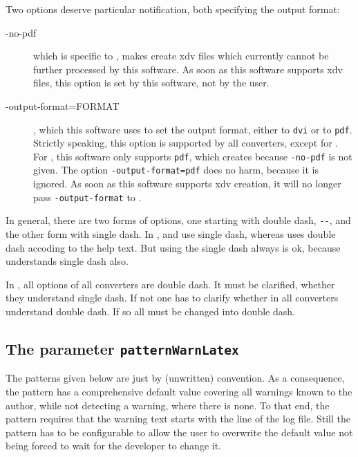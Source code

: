 Two options deserve particular notification, both specifying the output format: 
%
\begin{description}
  \item[-no-pdf] which is specific to \xelatex, makes \xelatex{} create xdv files 
  which currently cannot be further processed by this software. 
  As soon as this software supports xdv files, this option is set by this software, 
  not by the user. 
  \item[-output-format=FORMAT], which this software uses to set the output format, 
  either to \texttt{dvi} or to \texttt{pdf}. 
  Strictly speaking, this option is supported by all converters, except for \xelatex. 
  For \xelatex, this software only supports \texttt{pdf}, 
  which \xelatex{} creates because \texttt{-no-pdf} is not given. 
  The option \texttt{-output-format=pdf} does no harm, because it is ignored. 
  As soon as this software supports xdv creation, 
  it will no longer pass \texttt{-output-format} to \xelatex. 
\end{description}


In general, there are two forms of options, one starting with double dash, \texttt{-{}-}, 
and the other form with single dash. 
In \texlive, \pdflatex{} and \xelatex{} use single dash, 
whereas \lualatex{} uses double dash accoding to the help text. 
But using the single dash always is ok, 
because \lualatex{} understands single dash also. 

In \miktex, all options of all converters are double dash. 
It must be clarified, whether they understand single dash. 
If not one has to clarify whether in \texlive{} all converters understand double dash. 
If so all must be changed into double dash. 


\subsection{The parameter \texttt{patternWarnLatex}}
\label{subsec:patternWarnLatex}

The patterns given below are just by (unwritten) convention. 
As a consequence, the pattern has a comprehensive default value 
covering all warnings known to the author, 
while not detecting a warning, where there is none. 
To that end, the pattern requires 
that the warning text starts with the line of the log file. 
Still the pattern has to be configurable 
to allow the user to overwrite the default value 
not being forced to wait for the developer 
to change it. 


